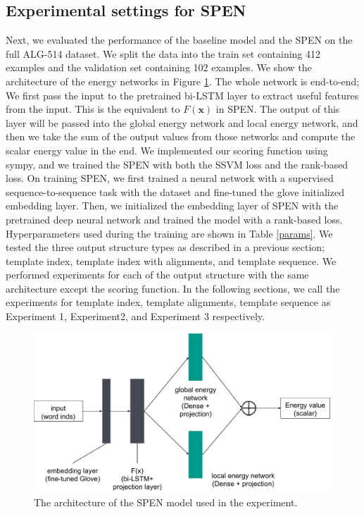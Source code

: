 \documentclass[11pt,letterpaper]{article}
\begin{document}
\subsection{Experimental settings for SPEN}
Next, we evaluated the performance of the baseline model and the SPEN on the full ALG-514 dataset. We split the data into the train set containing 412 examples and the validation set containing 102 examples. We show the architecture of the energy networks in Figure \ref{spen-architecture}. The whole network is end-to-end; We first pass the input to the pretrained bi-LSTM layer to extract useful features from the input. This is the equivalent to $F(\mathbf{x})$ in SPEN. The output of this layer will be passed into the global energy network and local energy network, and then we take the sum of the output values from those networks and compute the scalar energy value in the end. We implemented our scoring function using sympy, and we trained the SPEN with both the SSVM loss and the rank-based loss. On training SPEN, we first trained a neural network with a supervised sequence-to-sequence task with the dataset and fine-tuned the glove initialized embedding layer. Then, we initialized the embedding layer of SPEN with the pretrained deep neural network and trained the model with a rank-based loss. Hyperparameters used during the training are shown in Table \ref{params}. We tested the three output structure types as described in a previous section; template index, template index with alignments, and template sequence. We performed experiments for each of the output structure with the same architecture except the scoring function. In the following sections, we call the experiments for template index, template alignments, template sequence as Experiment 1, Experiment2, and Experiment 3 respectively.
\begin{figure}[ht]
	\centering
	\includegraphics[bb=0 0 609 324, scale=0.35]{spen_architecture.pdf}
    \caption{The architecture of the SPEN model used in the experiment.}
    \label{spen-architecture}
\end{figure}
\end{document}
